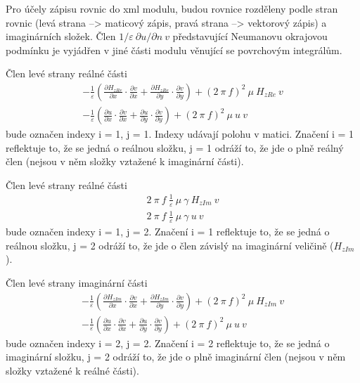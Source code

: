 \documentclass[12pt,a4paper,oneside]{article}
\numberwithin{equation}{section} %
\numberwithin{figure}{section} %
\numberwithin{table}{section} %
\begin{document}
Pro účely zápisu rovnic do xml modulu, budou rovnice rozděleny podle stran rovnic (levá strana --> maticový zápis, pravá strana --> vektorový zápis) a imaginárních složek. Člen $1/ \varepsilon ~ \partial u / \partial n ~ v$ představující Neumanovu okrajovou podmínku je vyjádřen v jiné části modulu věnující se povrchovým integrálům.

Člen levé strany reálné části
\begin{subequations}
\begin{gather}
- \frac{1}{\varepsilon} \left( \frac{\partial H _{zRe}}{\partial x} \cdot \frac{\partial v}{\partial x} + \frac{\partial H _{zRe}}{\partial y} \cdot \frac{\partial v}{\partial y} \right) + (2 ~ \pi ~ f) ^2 ~ \mu ~ H _{zRe} ~ v
\\
- \frac{1}{\varepsilon} \left( \frac{\partial u}{\partial x} \cdot \frac{\partial v}{\partial x} + \frac{\partial u}{\partial y} \cdot \frac{\partial v}{\partial y} \right) + (2 ~ \pi ~ f) ^2 ~ \mu ~ u ~ v
\end{gather}
\end{subequations}
bude označen indexy i = 1, j = 1. Indexy udávají polohu v matici. Značení i = 1 reflektuje to, že se jedná o reálnou složku, j = 1 odráží to, že jde o plně reálný člen (nejsou v něm složky vztažené k imaginární části). 

Člen levé strany reálné části
\begin{subequations}
\begin{gather}
2 ~ \pi ~ f ~ \frac{1}{\varepsilon} ~ \mu ~ \gamma ~ H _{zIm} ~ v
\\
2 ~ \pi ~ f ~ \frac{1}{\varepsilon} ~ \mu ~ \gamma ~ u ~ v
\end{gather}
\end{subequations}
bude označen indexy i = 1, j = 2. Značení i = 1 reflektuje to, že se jedná o reálnou složku, j = 2 odráží to, že jde o člen závislý na imaginární veličině ($H _{zIm}$).


Člen levé strany imaginární části
\begin{subequations}
\begin{gather}
- \frac{1}{\varepsilon} \left( \frac{\partial H _{zIm}}{\partial x} \cdot \frac{\partial v}{\partial x} + \frac{\partial H _{zIm}}{\partial y} \cdot \frac{\partial v}{\partial y} \right) + (2 ~ \pi ~ f) ^2 ~ \mu ~ H _{zIm} ~ v
\\
- \frac{1}{\varepsilon} \left( \frac{\partial u}{\partial x} \cdot \frac{\partial v}{\partial x} + \frac{\partial u}{\partial y} \cdot \frac{\partial v}{\partial y} \right) + (2 ~ \pi ~ f) ^2 ~ \mu ~ u ~ v
\end{gather}
\end{subequations}
bude označen indexy i = 2, j = 2. Značení i = 2 reflektuje to, že se jedná o imaginární složku, j = 2 odráží to, že jde o plně imaginární člen (nejsou v něm složky vztažené k reálné části). 
\end{document}
